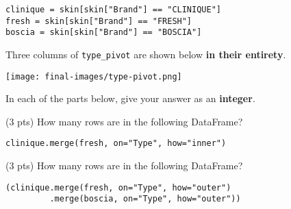 \documentclass[twoside,12pt]{article}
\begin{document}
\begin{probset}
\begin{prob}
\begin{verbatim}
clinique = skin[skin["Brand"] == "CLINIQUE"]
fresh = skin[skin["Brand"] == "FRESH"]
boscia = skin[skin["Brand"] == "BOSCIA"]

\end{verbatim}

Three columns of \texttt{type\_pivot} are shown below \textbf{in their entirety}.

\vspace{-0.05in}

\begin{center}

\texttt{[image: final-images/type-pivot.png]}

\end{center}

In each of the parts below, give your answer as an \textbf{integer}.

\begin{subprobset}

\begin{subprob}(3 pts) How many rows are in the following DataFrame?

\begin{verbatim}
clinique.merge(fresh, on="Type", how="inner")
\end{verbatim}

\inlineresponsebox[1.25in]{}


\end{subprob}







\begin{subprob}(3 pts) How many rows are in the following DataFrame?

\begin{verbatim}
(clinique.merge(fresh, on="Type", how="outer")
         .merge(boscia, on="Type", how="outer"))
\end{verbatim}


\end{subprob}
\end{subprobset}
\end{prob}
\end{probset}
\end{document}
